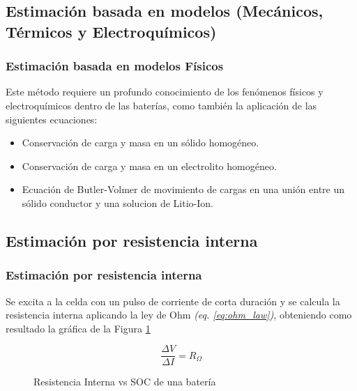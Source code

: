 \documentclass[10pt]{beamer}
\theoremstyle{remark}
\theoremstyle{definition}
\begin{document}
\subsection{Estimación basada en modelos (Mecánicos, Térmicos y
Electroquímicos)}

\begin{frame}[allowframebreaks]
  \frametitle{Estimación basada en modelos Físicos}

	Este método requiere un profundo conocimiento de los fenómenos físicos y
	electroquímicos dentro de las baterías, como también la aplicación de las
	siguientes ecuaciones:

	\begin{itemize}
	  \item Conservación de carga y masa en un sólido homogéneo.
	  \item Conservación de carga y masa en un electrolito homogéneo.
	  \item Ecuación de Butler-Volmer de movimiento de cargas en una unión entre
		un sólido conductor y una solucion de Litio-Ion.
	\end{itemize}

\end{frame}

\subsection{Estimación por resistencia interna}


\begin{frame}[allowframebreaks]
  \frametitle{Estimación por resistencia interna}
	
  	Se excita a la celda con un pulso de corriente de corta duración y se
	calcula la resistencia interna aplicando la ley de Ohm
	\emph{(eq. \ref{eq:ohm_law})}, obteniendo como resultado la gráfica de la
	Figura \ref{fig:r_ohm_result}

	\begin{equation}
	\frac{\Delta V}{\Delta I} = R_\Omega
	  \label{eq:ohm_law}
	\end{equation}

	\framebreak
	\begin{figure}[h!]
	  \centering
	  \caption{Resistencia Interna vs SOC de una batería}
	  \label{fig:r_ohm_result}
	\end{figure}

\end{frame}
\end{document}
